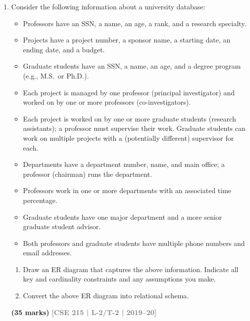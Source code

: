 \documentclass[12pt,a3paper]{article}
\newcommand{\yr}[1]{\hfill\textcolor{gray}{\small\textbf{[#1]}}}
\newcommand{\mk}[1]{\textcolor{orange!70!black}{\small\textbf{(#1 marks)}}}
\begin{document}
\begin{enumerate}
\begin{center}
\end{center}

\mk{5} \yr{CSE 215 | L-2/T-2 | 2020--21}

\item Consider the following information about a university database:
\begin{itemize}[leftmargin=1.5em,itemsep=1pt]
  \item Professors have an SSN, a name, an age, a rank, and a research specialty.
  \item Projects have a project number, a sponsor name, a starting date, an ending date, and a budget.
  \item Graduate students have an SSN, a name, an age, and a degree program (e.g., M.S.\ or Ph.D.).
  \item Each project is managed by one professor (principal investigator) and worked on by one or more professors (co-investigators).
  \item Each project is worked on by one or more graduate students (research assistants); a professor must supervise their work. Graduate students can work on multiple projects with a (potentially different) supervisor for each.
  \item Departments have a department number, name, and main office; a professor (chairman) runs the department.
  \item Professors work in one or more departments with an associated time percentage.
  \item Graduate students have one major department and a more senior graduate student advisor.
  \item Both professors and graduate students have multiple phone numbers and email addresses.
\end{itemize}
\begin{enumerate}
  \item Draw an ER diagram that captures the above information. Indicate all key and cardinality constraints and any assumptions you make.
  \item Convert the above ER diagram into relational schema.
\end{enumerate}
\mk{35} \yr{CSE 215 | L-2/T-2 | 2019--20}


\end{enumerate}
\end{document}
